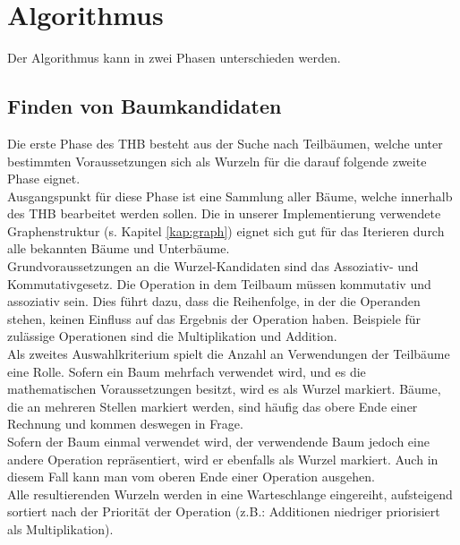 \chapter{Algorithmus}
Der Algorithmus kann in zwei Phasen unterschieden werden.

\section{Finden von Baumkandidaten}
Die erste Phase des \ac{THB} besteht aus der Suche nach Teilbäumen, welche unter bestimmten Voraussetzungen sich als Wurzeln für die darauf folgende zweite Phase eignet.\\
Ausgangspunkt für diese Phase ist eine Sammlung aller Bäume, welche innerhalb des \ac{THB} bearbeitet werden sollen. Die in unserer Implementierung verwendete Graphenstruktur (s. Kapitel \ref{kap:graph}) eignet sich gut für das Iterieren durch alle bekannten Bäume und Unterbäume.\\
Grundvoraussetzungen an die Wurzel-Kandidaten sind das Assoziativ- und Kommutativgesetz. Die Operation in dem Teilbaum müssen kommutativ und assoziativ sein. Dies führt dazu, dass die Reihenfolge, in der die Operanden stehen, keinen Einfluss auf das Ergebnis der Operation haben. Beispiele für zulässige Operationen sind die Multiplikation und Addition.\\
Als zweites Auswahlkriterium spielt die Anzahl an Verwendungen der Teilbäume eine Rolle. Sofern ein Baum mehrfach verwendet wird, und es die mathematischen Voraussetzungen besitzt, wird es als Wurzel markiert. Bäume, die an mehreren Stellen markiert werden, sind häufig das obere Ende einer Rechnung und kommen deswegen in Frage.\\
Sofern der Baum einmal verwendet wird, der verwendende Baum jedoch eine andere Operation repräsentiert, wird er ebenfalls als Wurzel markiert. Auch in diesem Fall kann man vom oberen Ende einer Operation ausgehen.\\
Alle resultierenden Wurzeln werden in eine Warteschlange eingereiht, aufsteigend sortiert nach der Priorität der Operation (z.B.: Additionen niedriger priorisiert als Multiplikation).\\

